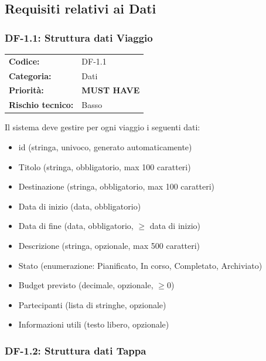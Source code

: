 \documentclass[12pt, a4paper]{article}
\newcommand{\MUST}{\colorbox{musthave}{\small\textbf{MUST HAVE}}}
\newcommand{\RISKL}{\colorbox{risklow}{\small Basso}}
\begin{document}
\subsection{Requisiti relativi ai Dati}

\subsubsection{DF-1.1: Struttura dati Viaggio}

\begin{tabular}{@{}ll@{}}
  \toprule
  \textbf{Codice:}          & DF-1.1 \\
  \textbf{Categoria:}       & Dati \\
  \textbf{Priorità:}        & \MUST \\
  \textbf{Rischio tecnico:} & \RISKL \\
  \bottomrule
\end{tabular}

\medskip
\noindent
Il sistema deve gestire per ogni viaggio i seguenti dati:

\begin{itemize}[leftmargin=1.5em, itemsep=1pt]
  \item id (stringa, univoco, generato automaticamente)
  \item Titolo (stringa, obbligatorio, max 100 caratteri)
  \item Destinazione (stringa, obbligatorio, max 100 caratteri)
  \item Data di inizio (data, obbligatorio)
  \item Data di fine (data, obbligatorio, \(\geq\) data di inizio)
  \item Descrizione (stringa, opzionale, max 500 caratteri)
  \item Stato (enumerazione: Pianificato, In corso, Completato, Archiviato)
  \item Budget previsto (decimale, opzionale, \(\geq 0\))
  \item Partecipanti (lista di stringhe, opzionale)
  \item Informazioni utili (testo libero, opzionale)
\end{itemize}

\subsubsection{DF-1.2: Struttura dati Tappa}
\end{document}
